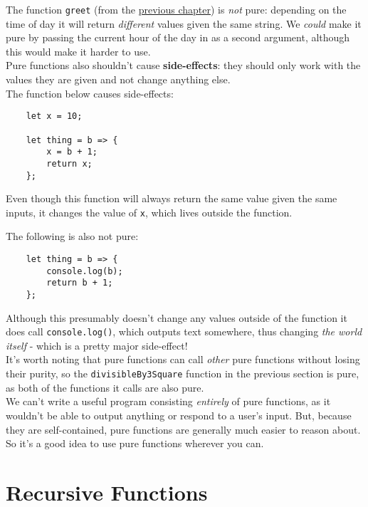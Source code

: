 The function \texttt{greet} (from the \hyperlink{greet}{previous chapter}) is \textit{not} pure: depending on the time of day it will return \textit{different} values given the same string. We \textit{could} make it pure by passing the current hour of the day in as a second argument, although this would make it harder to use.
\\

Pure functions also shouldn't cause \textbf{side-effects}: they should only work with the values they are given and not change anything else.
\\

The function below causes side-effects:

\begin{verbatim}
    let x = 10;

    let thing = b => {
        x = b + 1;
        return x;
    };
\end{verbatim}

Even though this function will always return the same value given the same inputs, it changes the value of \texttt{x}, which lives outside the function.

\pagebreak

The following is also not pure:

\begin{verbatim}
    let thing = b => {
        console.log(b);
        return b + 1;
    };
\end{verbatim}

Although this presumably doesn't change any values outside of the function it does call \texttt{console.log()}, which outputs text somewhere, thus changing \textit{the world itself} - which is a pretty major side-effect!
\\

It's worth noting that pure functions can call \textit{other} pure functions without losing their purity, so the \texttt{divisibleBy3Square} function in the previous section is pure, as both of the functions it calls are also pure.
\\

We can't write a useful program consisting \textit{entirely} of pure functions, as it wouldn't be able to output anything or respond to a user's input. But, because they are self-contained, pure functions are generally much easier to reason about. So it's a good idea to use pure functions wherever you can.

\pagebreak


\section{Recursive Functions}

